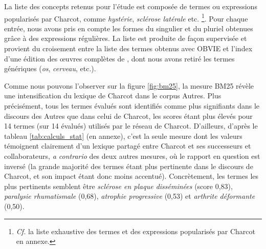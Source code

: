 La liste des concepts retenus pour l'étude est composée de termes ou expressions popularisés par Charcot, comme \textit{hystérie}, \textit{sclérose latérale} etc. \citep[p.~1102]{camargo2023} \footnote{\textit{Cf.} la liste exhaustive des termes et des expressions popularisés par Charcot en annexe.}. Pour chaque entrée, nous avons pris en compte les formes du singulier et du pluriel obtenues grâce à des expressions régulières. La liste est  produite de façon supervisée et provient du croisement entre la liste des termes obtenus avec OBVIE et l'index d'une édition des \oe{}uvres complètes de \cite[pp.~493--507]{charcot1892oeuvres}, dont nous avons retiré les termes génériques (\textit{os}, \textit{cerveau}, etc.).

Comme nous pouvons l'observer sur la figure \ref{fig:bm25}, la mesure \textsc{BM25} révèle une intensification du lexique de Charcot dans le corpus \og{}Autres\fg{}. Plus précisément, tous les termes évalués sont identifiés comme plus signifiants dans le discours des \og{}Autres\fg{} que dans celui de Charcot, les scores étant plus élevés pour 14 termes (sur 14 évalués) utilisés par le réseau de Charcot. D'ailleurs, d'après le tableau \ref{tab:calculs_stat} (en annexe), c'est la seule mesure dont les valeurs témoignent clairement d'un lexique partagé entre Charcot et ses successeurs et collaborateurs, \textit{a contrario} des deux autres mesures, où le rapport en question est inversé (la grande majorité des termes étant plus pertinente dans le discours de Charcot, et son impact étant donc moins accentué). Concrètement, les termes les plus pertinents semblent être \textit{sclérose en plaque disséminées} (score 0,83), \textit{paralysie rhumatismale} (0,68), \textit{atrophie progressive} (0,53) et \textit{arthrite déformante} (0,50).
